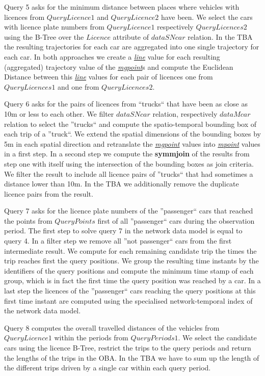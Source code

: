 \documentclass[a4paper]{article}
\newcommand{\op}[1]{\textbf{#1}}
\newcommand{\dt}[1]{\textsl{\underline{#1}}}
\begin{document}
{Query 5 asks for the minimum distance between places where vehicles with
licences from $QueryLicence1$ and $QueryLicence2$ have been. We select the cars
with licence plate numbers from $QueryLicence1$ respectively $QueryLicences2$ using the
B-Tree over the $Licence$ attribute of $dataSNcar$ relation. In the TBA the
resulting trajectories for each car are aggregated into one single trajectory
for each car. In both approaches we create a \dt{line} value for each resulting
(aggregated) trajectory value of the \dt{mgpoint}s and compute the Euclidean Distance
between this \dt{line} values for each pair of licences one from $QueryLicences1$ and one
from $QueryLicences2$.

Query 6 asks for the pairs of licences from ``trucks`` that have been as close as
10m or less to each other. We filter $dataSNcar$ relation, respectively $dataMcar$
relation to select the ''trucks`` and compute the spatio-temporal bounding box
of each trip of a ''truck``. We extend the spatial dimensions of the bounding boxes
by 5m in each spatial direction and retranslate the \dt{mgpoint} values into \dt{mpoint}
values in a first step. In a second step we compute the \op{symmjoin} of the results from
step one with itself using the intersection of the bounding boxes as join criteria.
We filter the result to include all licence pairs of ''trucks`` that had sometimes
a distance lower than 10m. In the TBA we additionally remove the duplicate licence
pairs from the result.

Query 7 asks for the licence plate numbers of the ''passenger`` cars that reached
the points from $QueryPoints$ first of all ''passenger`` cars during the
observation period. The first step to solve query 7 in the network data model is
equal to query 4. In a filter step we remove all ''not passenger`` cars from the
first intermediate result. We compute for each remaining candidate trip the times
the trip reaches first the query positions. We group the resulting time instants
by the identifiers of the query positions and compute the minimum time stamp of
each group, which is in fact the first time the query position was reached by a
car. In a last step the licences of the ''passenger`` cars reaching the query
positions at this first time instant are computed using the specialised
network-temporal index of the network data model.

Query 8 computes the overall travelled distances of the vehicles from $QueryLicence1$
within the periods from $QueryPeriods1$. We select the candidate cars using the
licence B-Tree, restrict the trips to the query periods and return the lengths of the
trips in the OBA. In the TBA we have to sum up the length of the different
trips driven by a single car within each query period.

}
\end{document}
